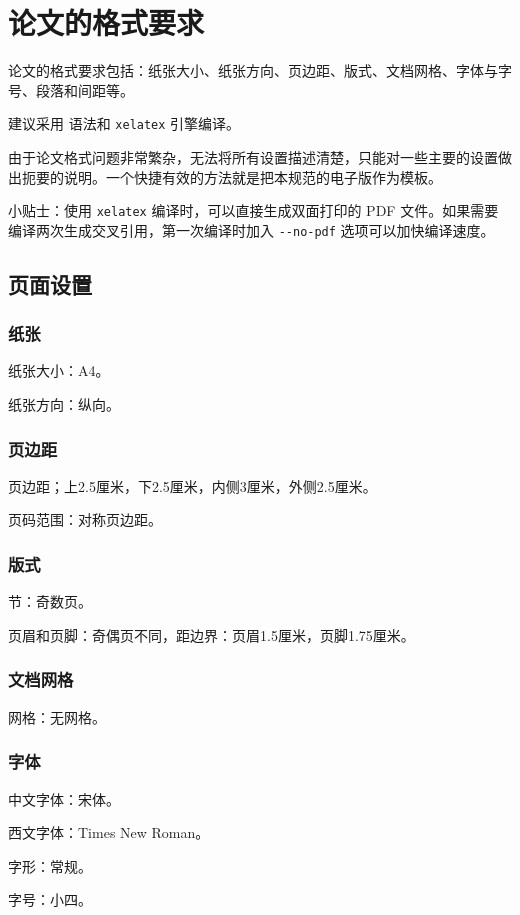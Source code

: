 \chapter{论文的格式要求}
\label{chap:formats}
\par 论文的格式要求包括：纸张大小、纸张方向、页边距、版式、文档网格、字体与字号、段落和间距等\cite{机器学习}。
\par 建议采用 \LaTeXe 语法和 \verb|xelatex| 引擎编译。
\par 由于论文格式问题非常繁杂，无法将所有设置描述清楚，只能对一些主要的设置做出扼要的说明。一个快捷有效的方法就是把本规范的电子版作为模板。
\par 小贴士：使用 \verb|xelatex| 编译时，可以直接生成双面打印的 PDF 文件。如果需要编译两次生成交叉引用，第一次编译时加入 \verb|--no-pdf| 选项可以加快编译速度。

\section{页面设置}
\subsection{纸张}
\par 纸张大小：A4。
\par 纸张方向：纵向。

\subsection{页边距}
\par 页边距；上2.5厘米，下2.5厘米，内侧3厘米，外侧2.5厘米。
\par 页码范围：对称页边距。

\subsection{版式}
\par 节：奇数页。
\par 页眉和页脚：奇偶页不同，距边界：页眉1.5厘米，页脚1.75厘米。

\subsection{文档网格}
\par 网格：无网格。

\subsection{字体}
\par 中文字体：宋体。
\par 西文字体：Times New Roman。
\par 字形：常规。
\par 字号：小四。

